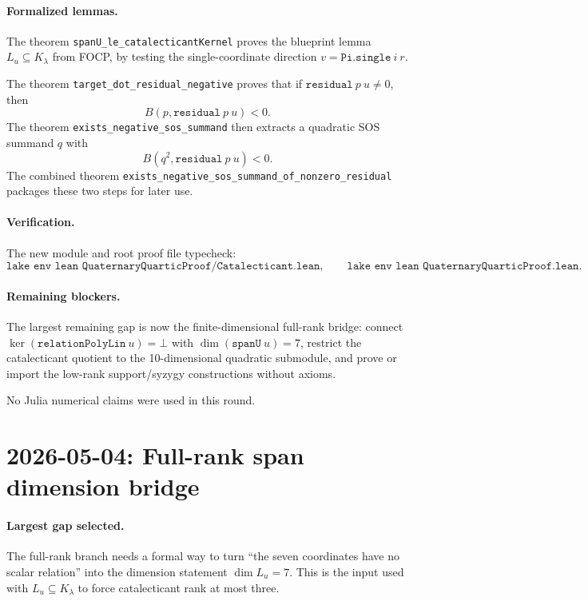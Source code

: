 \documentclass[11pt]{article}
\begin{document}
\paragraph{Formalized lemmas.}
The theorem
\texttt{spanU\_le\_catalecticantKernel} proves the blueprint lemma
\(L_u\subseteq K_\lambda\) from FOCP, by testing the single-coordinate
direction \(v=\texttt{Pi.single}\ i\ r\).

The theorem \texttt{target\_dot\_residual\_negative} proves that if
\(\texttt{residual}\ p\ u\ne0\), then
\[
  B(p,\texttt{residual}\ p\ u)<0.
\]
The theorem \texttt{exists\_negative\_sos\_summand} then extracts a quadratic
SOS summand \(q\) with
\[
  B(q^2,\texttt{residual}\ p\ u)<0.
\]
The combined theorem
\texttt{exists\_negative\_sos\_summand\_of\_nonzero\_residual} packages these
two steps for later use.

\paragraph{Verification.}
The new module and root proof file typecheck:
\[
\texttt{lake env lean QuaternaryQuarticProof/Catalecticant.lean},\qquad
\texttt{lake env lean QuaternaryQuarticProof.lean}.
\]

\paragraph{Remaining blockers.}
The largest remaining gap is now the finite-dimensional full-rank bridge:
connect \(\ker(\texttt{relationPolyLin}\ u)=\bot\) with
\(\dim(\texttt{spanU}\ u)=7\), restrict the catalecticant quotient to the
10-dimensional quadratic submodule, and prove or import the low-rank
support/syzygy constructions without axioms.

No Julia numerical claims were used in this round.

\section*{2026-05-04: Full-rank span dimension bridge}

\paragraph{Largest gap selected.}
The full-rank branch needs a formal way to turn ``the seven coordinates have
no scalar relation'' into the dimension statement \(\dim L_u=7\).  This is the
input used with \(L_u\subseteq K_\lambda\) to force catalecticant rank at most
three.
\end{document}
